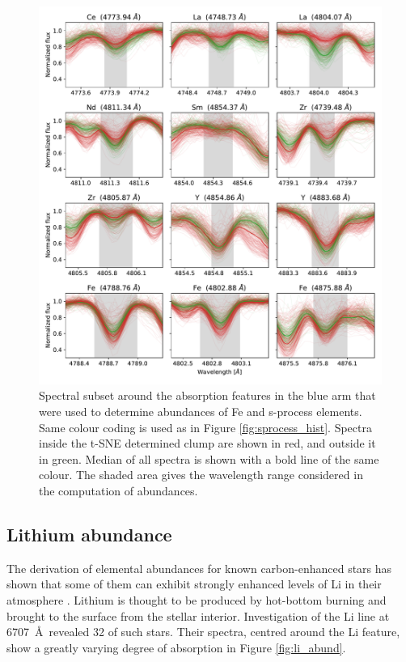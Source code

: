 \begin{figure}
	\centering
	\includegraphics[width=\textwidth]{sprocess_spectra.pdf}
	\caption{Spectral subset around the absorption features in the blue arm that were used to determine abundances of Fe and s-process elements. Same colour coding is used as in Figure \ref{fig:sprocess_hist}. Spectra inside the t-SNE determined clump are shown in red, and outside it in green. Median of all spectra is shown with a bold line of the same colour. The shaded area gives the wavelength range considered in the computation of abundances.}
	\label{fig:sprocess_spectrum}
\end{figure} 

\subsection{Lithium abundance}
\label{sec:lithium}
The derivation of elemental abundances for known carbon-enhanced stars has shown that some of them can exhibit strongly enhanced levels of Li in their atmosphere \citep{1991A&A...245L...1A}. Lithium is thought to be produced by hot-bottom burning \citep{1974ApJ...187..555S} and brought to the surface from the stellar interior. Investigation of the Li line at 6707~\AA\ revealed 32 of such stars. Their spectra, centred around the Li feature, show a greatly varying degree of absorption in Figure \ref{fig:li_abund}.

